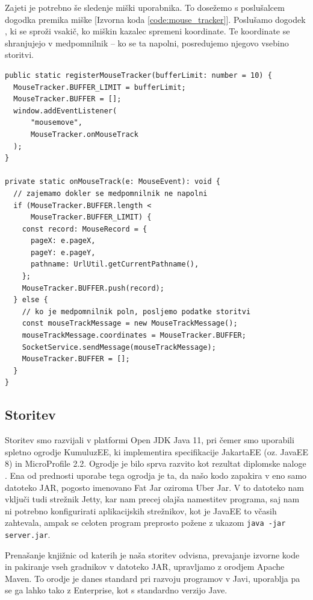 \documentclass[a4paper, 12pt]{book}
\begin{document}
Zajeti je potrebno še sledenje miški uporabnika. To dosežemo s poslušalcem dogodka premika miške [Izvorna koda \ref{code:mouse_tracker}]. Poslušamo dogodek , ki se sproži vsakič, ko miškin kazalec spremeni koordinate. Te koordinate se shranjujejo v medpomnilnik -- ko se ta napolni, posredujemo njegovo vsebino storitvi.

\begin{lstlisting}[label=code:mouse_tracker, caption=Spremljanje premikov miške]
public static registerMouseTracker(bufferLimit: number = 10) {
  MouseTracker.BUFFER_LIMIT = bufferLimit;
  MouseTracker.BUFFER = [];
  window.addEventListener(
      "mousemove",
      MouseTracker.onMouseTrack
  );
}

private static onMouseTrack(e: MouseEvent): void {
  // zajemamo dokler se medpomnilnik ne napolni
  if (MouseTracker.BUFFER.length < 
      MouseTracker.BUFFER_LIMIT) {
    const record: MouseRecord = {
      pageX: e.pageX,
      pageY: e.pageY,
      pathname: UrlUtil.getCurrentPathname(),
    };
    MouseTracker.BUFFER.push(record);
  } else {
    // ko je medpomnilnik poln, posljemo podatke storitvi
    const mouseTrackMessage = new MouseTrackMessage();
    mouseTrackMessage.coordinates = MouseTracker.BUFFER;
    SocketService.sendMessage(mouseTrackMessage);
    MouseTracker.BUFFER = [];
  }
}
\end{lstlisting} 

\subsection{Storitev}
\label{ch3:sec2:sub2}

Storitev smo razvijali v platformi Open JDK Java 11, pri čemer smo uporabili spletno ogrodje KumuluzEE, ki implementira specifikacije JakartaEE (oz. JavaEE 8) in MicroProfile 2.2. Ogrodje je bilo sprva razvito kot rezultat diplomske naloge \cite{kumuluz_diploma}. Ena od prednosti uporabe tega ogrodja je ta, da našo kodo zapakira v eno samo datoteko JAR, pogosto imenovano Fat Jar oziroma Uber Jar. V to datoteko nam vključi tudi strežnik Jetty, kar nam precej olajša namestitev programa, saj nam ni potrebno konfigurirati aplikacijskih strežnikov, kot je JavaEE to včasih zahtevala, ampak se celoten program preprosto požene z ukazom \verb|java -jar server.jar|.

Prenašanje knjižnic od katerih je naša storitev odvisna, prevajanje izvorne kode in pakiranje vseh gradnikov v datoteko JAR, upravljamo z orodjem Apache Maven. To orodje je danes standard pri razvoju programov v Javi, uporablja pa se ga lahko tako z Enterprise, kot s standardno verzijo Jave.
\end{document}
